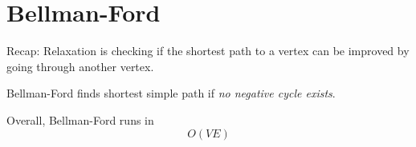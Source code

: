 \documentclass{article}
\begin{document}
\section*{Bellman-Ford}
Recap: Relaxation is checking if the shortest path to a vertex can be improved
by going through another vertex.

Bellman-Ford finds shortest simple path if \emph{no negative cycle exists}.

Overall, Bellman-Ford runs in
\begin{equation*}
    O(VE)
\end{equation*}
\end{document}
